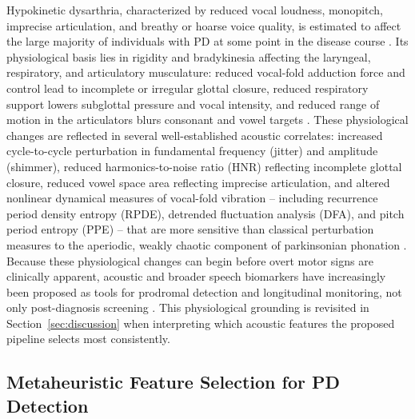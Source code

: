 Hypokinetic dysarthria, characterized by reduced vocal loudness,
monopitch, imprecise articulation, and breathy or hoarse voice quality, is
estimated to affect the large majority of individuals with PD at some
point in the disease course \cite{Ho:1999,Cao:2025}. Its physiological
basis lies in rigidity and bradykinesia affecting the laryngeal,
respiratory, and articulatory musculature: reduced vocal-fold adduction
force and control lead to incomplete or irregular glottal closure, reduced
respiratory support lowers subglottal pressure and vocal intensity, and
reduced range of motion in the articulators blurs consonant and vowel
targets \cite{Yang:2020}. These physiological changes are reflected in
several well-established acoustic correlates: increased cycle-to-cycle
perturbation in fundamental frequency (jitter) and amplitude (shimmer),
reduced harmonics-to-noise ratio (HNR) reflecting incomplete glottal
closure, reduced vowel space area reflecting imprecise articulation, and
altered nonlinear dynamical measures of vocal-fold vibration -- including
recurrence period density entropy (RPDE), detrended fluctuation analysis
(DFA), and pitch period entropy (PPE) -- that are more sensitive than
classical perturbation measures to the aperiodic, weakly chaotic component
of parkinsonian phonation \cite{Yang:2020}. Because these physiological
changes can begin before overt motor signs are clinically apparent,
acoustic and broader speech biomarkers have increasingly been proposed as
tools for prodromal detection and longitudinal monitoring, not only
post-diagnosis screening \cite{Rusz:2024,Cao:2025}. This physiological
grounding is revisited in Section~\ref{sec:discussion} when interpreting
which acoustic features the proposed pipeline selects most consistently.

\subsection{Metaheuristic Feature Selection for PD Detection}
\label{sec:2.3}

